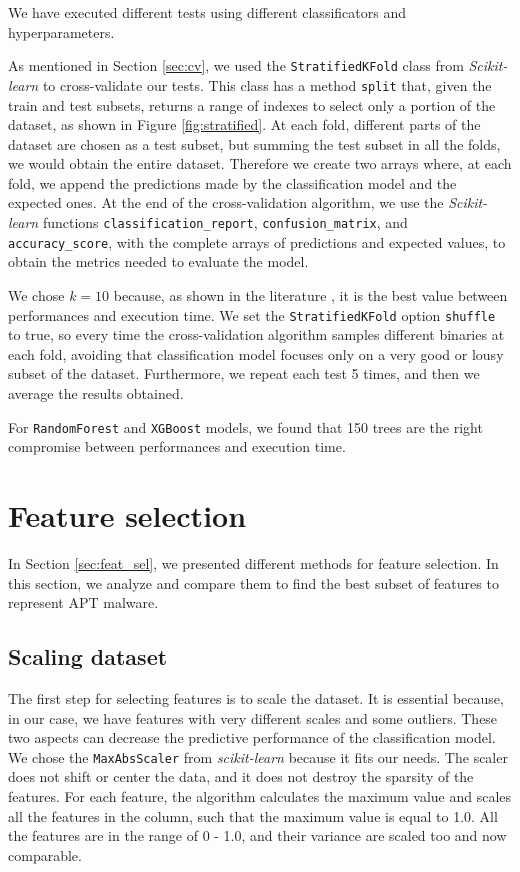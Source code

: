 We have executed different tests using different classificators and hyperparameters. 

As mentioned in Section \ref{sec:cv}, we used the \texttt{StratifiedKFold} class from \textit{Scikit-learn} to cross-validate our tests. This class has a method \texttt{split} that, given the train and test subsets, returns a range of indexes to select only a portion of the dataset, as shown in Figure \ref{fig:stratified}.  At each fold, different parts of the dataset are chosen as a test subset, but summing the test subset in all the folds, we would obtain the entire dataset. Therefore we create two arrays where, at each fold, we append the predictions made by the classification model and the expected ones. At the end of the cross-validation algorithm, we use the \textit{Scikit-learn} functions \texttt{classification\_report}, \texttt{confusion\_matrix}, and \texttt{accuracy\_score}, with the complete arrays of predictions and expected values, to obtain the metrics needed to evaluate the model.

We chose $k = 10$ because, as shown in the literature \cite{kohavi1995study}, it is the best value between performances and execution time. 
We set the \texttt{StratifiedKFold} option \texttt{shuffle} to true, so every time the cross-validation algorithm samples different binaries at each fold, avoiding that classification model focuses only on a very good or lousy subset of the dataset. Furthermore, we repeat each test 5 times, and then we average the results obtained.

For \texttt{RandomForest} and \texttt{XGBoost} models, we found that 150 trees are the right compromise between performances and execution time.

\section{Feature selection}
In Section \ref{sec:feat_sel}, we presented different methods for feature selection. In this section, we analyze and compare them to find the best subset of features to represent APT malware.

\subsection{Scaling dataset}
The first step for selecting features is to scale the dataset. It is essential because, in our case, we have features with very different scales and some outliers. These two aspects can decrease the predictive performance of the classification model. We chose the \texttt{MaxAbsScaler} from \textit{scikit-learn} because it fits our needs. The scaler does not shift or center the data, and it does not destroy the sparsity of the features. For each feature, the algorithm calculates the maximum value and scales all the features in the column, such that the maximum value is equal to 1.0. All the features are in the range of 0 - 1.0, and their variance are scaled too and now comparable.

